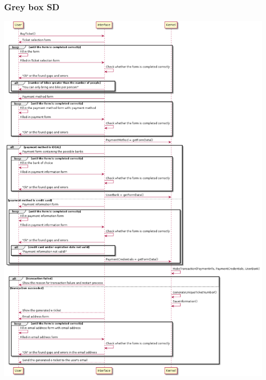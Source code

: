 \subsubsection{Grey box SD}
\creator{\studentC}
\updater{\studentA}
\begin{lrbox}{\mysavebox}%
\includegraphics[scale=0.45]{Iteration_3/Files/UC1_gb.png}
\end{lrbox}

\ifdim\ht\mysavebox>\textheight
    \setlength{\myrest}{\ht\mysavebox}%
    \loop\ifdim\myrest>\textheight
        \newpage\par\noindent
        \clipbox{0 {\myrest-\textheight} 0 {\ht\mysavebox-\myrest}}{\usebox{\mysavebox}}%
        \addtolength{\myrest}{-\textheight}%
    \repeat
    \newpage\par\noindent
    \clipbox{0 0 0 {\ht\mysavebox-\myrest}}{\usebox{\mysavebox}}%
\else
    \usebox{\mysavebox}%
\fi

